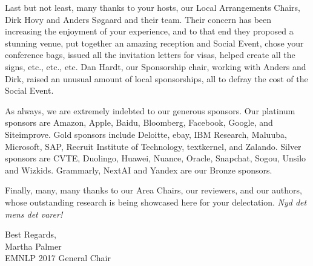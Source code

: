 Last but not least, many thanks to your hosts, our Local Arrangements Chairs, Dirk Hovy and Anders Søgaard and their team.  Their concern has been increasing the enjoyment of your experience, and to that end they proposed a stunning venue, put together an amazing reception and Social Event, chose your conference bags, issued all the invitation letters for visas, helped create all the signs, etc., etc., etc.  Dan Hardt, our Sponsorship chair, working with Anders and Dirk, raised an unusual amount of local sponsorships, all to defray the cost of the Social Event.

As always, we are extremely indebted to our generous sponsors. Our platinum sponsors are Amazon, Apple, Baidu, Bloomberg, Facebook, Google, and Siteimprove.  Gold sponsors include Deloitte, ebay, IBM Research, Maluuba, Microsoft, SAP, Recruit Institute of Technology, textkernel, and Zalando.  Silver sponsors are CVTE, Duolingo, Huawei, Nuance, Oracle, Snapchat, Sogou, Unsilo and Wizkids. Grammarly, NextAI and Yandex are our Bronze sponsors.

Finally, many, many thanks to our Area Chairs, our reviewers, and our authors, whose outstanding research is being showcased here for your delectation. \textit{Nyd det mens det varer!}

\vspace{3em}
\noindent
Best Regards,\\
Martha Palmer\\
EMNLP 2017 General Chair



